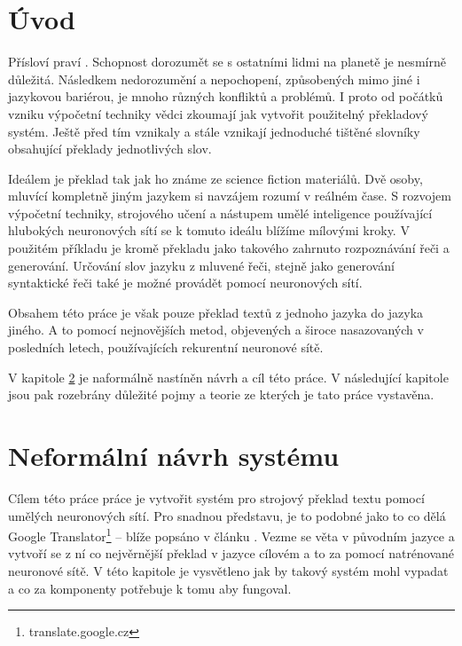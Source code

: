 \chapter{Úvod}
Přísloví praví . Schopnost dorozumět se s ostatními lidmi na planetě je nesmírně důležitá. Následkem nedorozumění a nepochopení, způsobených mimo jiné i jazykovou bariérou, je mnoho různých konfliktů a problémů. I proto od počátků vzniku výpočetní techniky vědci zkoumají jak vytvořit použitelný překladový systém. Ještě před tím vznikaly a stále vznikají jednoduché tištěné slovníky obsahující překlady jednotlivých slov.

Ideálem je překlad tak jak ho známe ze science fiction materiálů. Dvě osoby, mluvící kompletně jiným jazykem si navzájem rozumí v reálném čase. S rozvojem výpočetní techniky, strojového učení a nástupem umělé inteligence používající hlubokých neuronových sítí se k tomuto ideálu blížíme mílovými kroky. V použitém příkladu je kromě překladu jako takového zahrnuto rozpoznávání řeči a generování. Určování slov jazyku z mluvené řeči, stejně jako generování syntaktické řeči také je možné provádět pomocí neuronových sítí.

Obsahem této práce je však pouze překlad textů z jednoho jazyka do jazyka jiného. A to pomocí nejnovějších metod, objevených a široce nasazovaných v posledních letech, používajících rekurentní neuronové sítě.

V kapitole \ref{chapter:draft} je naformálně nastíněn návrh a cíl této práce. V následující kapitole jsou pak rozebrány důležité pojmy a teorie ze kterých je tato práce vystavěna.

\chapter{Neformální návrh systému} \label{chapter:draft}
Cílem této práce práce je vytvořit systém pro strojový překlad textu pomocí umělých neuronových sítí. Pro snadnou představu, je to podobné jako to co dělá Google Translator\footnote{translate.google.cz} -- blíže popsáno v článku \cite{googleBridgingGap}. Vezme se věta v původním jazyce a vytvoří se z ní co nejvěrnější překlad v jazyce cílovém a to za pomocí natrénované neuronové sítě. V této kapitole je vysvětleno jak by takový systém mohl vypadat a co za komponenty potřebuje k tomu aby fungoval.

